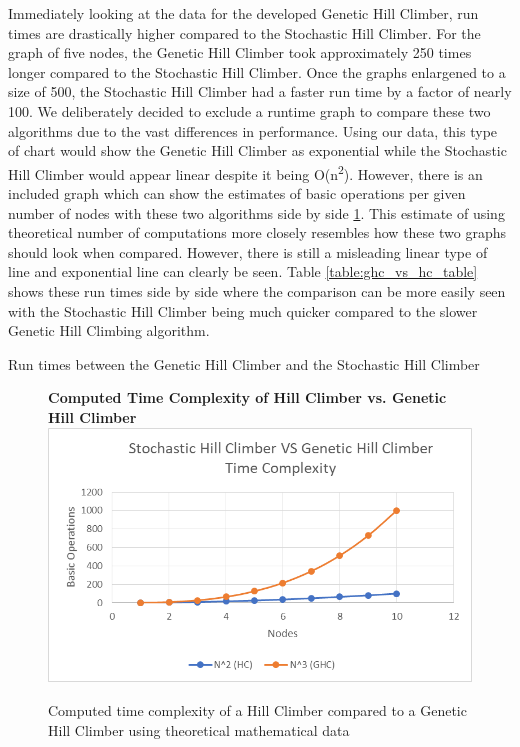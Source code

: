 \documentclass[sigplan,screen]{acmart}
\begin{document}
Immediately looking at the data for the developed Genetic Hill Climber, run
times are drastically higher compared to the Stochastic Hill Climber. For the
graph of five nodes, the Genetic Hill Climber took approximately 250 times
longer compared to the Stochastic Hill Climber. Once the graphs enlargened to a
size of 500, the Stochastic Hill Climber had a faster run time by a factor of
nearly 100. We deliberately decided to exclude a runtime graph to compare these
two algorithms due to the vast differences in performance.  Using our data, this
type of chart would show the Genetic Hill Climber as exponential while the
Stochastic Hill Climber would appear linear despite it being
O(n\textsuperscript{2}). However, there is an included graph which can show the
estimates of basic operations per given number of nodes with these two
algorithms side by side \ref{fig:hc_vs_ghc}. This estimate of using theoretical
number of computations more closely resembles how these two graphs should look
when compared. However, there is still a misleading linear type of line and
exponential line can clearly be seen. Table \ref{table:ghc_vs_hc_table} shows
these run times side by side where the comparison can be more easily seen with
the Stochastic Hill Climber being much quicker compared to the slower Genetic
Hill Climbing algorithm.

\begin{table}[h]
    \setlength\tabcolsep{2pt}
    \centering
    
    \caption{Run times between the Genetic Hill Climber and the Stochastic Hill Climber}
    \label{table:ghc_vs_hc_table}
\end{table}

\begin{figure}[h]
    \centering
    \textbf{Computed Time Complexity of Hill Climber vs. Genetic Hill Climber}
    \includegraphics[width=\columnwidth]{assets/hc_vs_ghc.png}
    \caption{Computed time complexity of a Hill Climber compared to a Genetic Hill Climber using theoretical mathematical data}
    \label{fig:hc_vs_ghc}
\end{figure}
\end{document}
